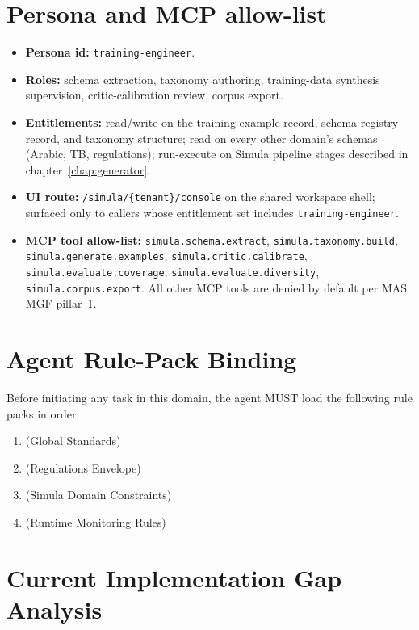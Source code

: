 \section{Persona and MCP allow-list}
\label{sec:agent-persona}
\begin{itemize}
  \item \textbf{Persona id:} \texttt{training-engineer}.
  \item \textbf{Roles:} schema extraction, taxonomy authoring,
    training-data synthesis supervision, critic-calibration review,
    corpus export.
  \item \textbf{Entitlements:} read/write on the training-example
    record, schema-registry record, and taxonomy structure; read on
    every other domain's schemas (Arabic, TB, regulations);
    run-execute on Simula pipeline stages described in
    chapter~\ref{chap:generator}.
  \item \textbf{UI route:} \texttt{/simula/\{tenant\}/console} on the
    shared workspace shell; surfaced only to callers whose
    entitlement set includes \texttt{training-engineer}.
  \item \textbf{MCP tool allow-list:}
    \texttt{simula.schema.extract}, \texttt{simula.taxonomy.build},
    \texttt{simula.generate.examples},
    \texttt{simula.critic.calibrate},
    \texttt{simula.evaluate.coverage},
    \texttt{simula.evaluate.diversity},
    \texttt{simula.corpus.export}. All other MCP tools are denied by
    default per MAS MGF pillar~1.
\end{itemize}

\section{Agent Rule-Pack Binding}
\label{sec:agent-rule-binding}
Before initiating any task in this domain, the agent MUST load the following rule packs in order:
\begin{enumerate}
  \item {} (Global Standards)
  \item {} (Regulations Envelope)
  \item {} (Simula Domain Constraints)
  \item {} (Runtime Monitoring Rules)
\end{enumerate}

\section{Current Implementation Gap Analysis}
\label{sec:current-gap-analysis}

